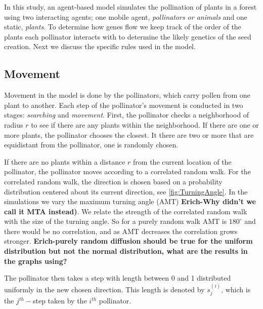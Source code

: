In this study, an agent-based model simulates the pollination of plants in a
forest using two interacting agents; one mobile agent, \emph{pollinators or
animals} and one static, \emph{plants}.  To determine how genes flow we keep
track of the order of the plants each pollinator interacts with to determine the
likely genetics of the seed creation.  Next we discuss the specific rules used
in the model.

\subsection{Movement}

Movement in the model is done by the pollinators, which carry pollen from one
plant to another.  Each step of the pollinator's movement is conducted in two
stages: \emph{searching} and \emph{movement}.  First, the pollinator checks a
neighborhood of radius $r$ to see if there are any plants within the
neighborhood.  If there are one or more plants, the pollinator chooses the
closest.  It there are two or more that are equidistant from the pollinator, one
is randomly chosen.

If there are no plants within a distance $r$ from the current location of the
pollinator, the pollinator moves according to a correlated random walk.  For the
correlated random walk, the direction is chosen based on a probability
distribution centered about its current direction, see
\autoref{fig:TurningAngle}.  In the simulations we vary the maximum turning
angle (AMT) {\bf Erich-Why didn't we call it MTA instead)}.  We relate the
strength of the correlated random walk with the size of the turning angle.  So
for a purely random walk AMT is $180^{\circ}$ and there would be no correlation,
and as AMT decreases the correlation grows stronger.
{\bf Erich-purely random diffusion should be true for the uniform distribution
but not the normal distribution, what are the results in the graphs using?}

The pollinator then takes a step with length between 0 and 1 distributed
uniformly in the new chosen direction.  This length is denoted by $s_j^{(i)}$,
which is the $j^{th}-$step taken by the $i^{th}$ pollinator.

